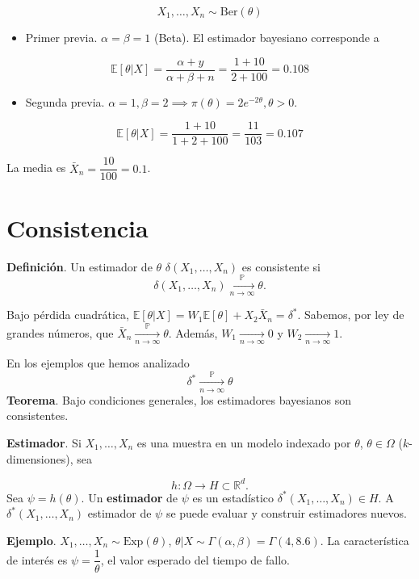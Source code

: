 \documentclass[
  12pt,
]{book}
\providecommand{\tightlist}{%
  \setlength{\itemsep}{0pt}\setlength{\parskip}{0pt}}
\begin{document}
\[ X_1,\dots,X_n\sim \text{Ber}(\theta)\]

\begin{itemize}
\tightlist
\item
  Primer previa. \(\alpha = \beta = 1\) (Beta). El estimador bayesiano corresponde a
\end{itemize}

\[ \mathbb{E}[\theta|X] = \dfrac{\alpha+y}{\alpha+\beta+n} = \dfrac{1+10}{2+100} = 0.108\]

\begin{itemize}
\tightlist
\item
  Segunda previa. \(\alpha =1, \beta=2 \implies \pi(\theta) = 2e^{-2\theta}, \theta >0\).
\end{itemize}

\[ \mathbb{E}[\theta|X] = \dfrac{1+10}{1+2+100} = \dfrac{11}{103}=0.107\]

La media es \(\bar X_n = \dfrac{10}{100} = 0.1\).

\hypertarget{consistencia}{%
\section{Consistencia}\label{consistencia}}

\textbf{Definición}. Un estimador de \(\theta\) \(\delta(X_1,\dots, X_n)\) es consistente si \[\delta(X_1,\dots, X_n)\xrightarrow[n\to \infty]{\mathbb{P}}\theta.\]

Bajo pérdida cuadrática, \(\mathbb{E}[\theta|X] = W_1\mathbb{E}[\theta] + X_2\bar X_n = \delta^*\). Sabemos, por ley de grandes números, que \(\bar X_n \xrightarrow[n\to \infty]{\mathbb{P}}\theta\). Además, \(W_1\xrightarrow[n\to \infty]{}0\) y \(W_2\xrightarrow[n\to \infty]{}1\).

En los ejemplos que hemos analizado
\[\delta^* \xrightarrow[n\to \infty]{\mathbb{P}}\theta \]
\textbf{Teorema}. Bajo condiciones generales, los estimadores bayesianos son consistentes.

\textbf{Estimador}. Si \(X_1,\dots, X_n\) es una muestra en un modelo indexado por \(\theta\), \(\theta \in \Omega\) (\(k\)-dimensiones), sea

\[h:\Omega \to H \subset \mathbb{R}^d.\]
Sea \(\psi = h(\theta)\). Un \textbf{estimador} de \(\psi\) es un estadístico \(\delta^*(X_1,\dots, X_n) \in H\). A \(\delta^*(X_1,\dots, X_n)\) estimador de \(\psi\) se puede evaluar y construir estimadores nuevos.

\textbf{Ejemplo}. \(X_1,\dots, X_n \sim \text{Exp}(\theta)\), \(\theta|X \sim \Gamma(\alpha,\beta) = \Gamma (4,8.6)\). La característica de interés es \(\psi = \dfrac{1}\theta\), el valor esperado del tiempo de fallo.
\end{document}

